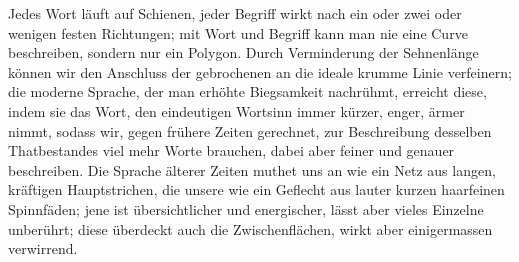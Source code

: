 Jedes Wort läuft auf Schienen, jeder Begriff wirkt nach ein oder zwei oder wenigen festen Richtungen; mit Wort und Begriff kann man nie eine Curve beschreiben, sondern nur ein Polygon. Durch Verminderung der Sehnenlänge können wir den Anschluss der gebrochenen an die ideale krumme Linie verfeinern; die moderne Sprache, der man erhöhte Biegsamkeit nachrühmt, erreicht diese, indem sie das Wort, den eindeutigen Wortsinn immer kürzer, enger, ärmer nimmt, sodass wir, gegen frühere Zeiten gerechnet, zur Beschreibung desselben Thatbestandes viel mehr Worte brauchen, dabei aber feiner und genauer beschreiben. Die Sprache älterer Zeiten muthet uns an wie ein Netz aus langen, kräftigen Hauptstrichen, die unsere wie ein Geflecht aus lauter kurzen haarfeinen Spinnfäden; jene ist übersichtlicher und energischer, lässt aber vieles Einzelne unberührt; diese überdeckt auch die Zwischenflächen, wirkt aber einigermassen verwirrend.
\par

